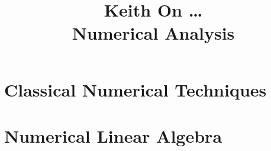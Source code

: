 \documentclass[openany]{book}
\title{
  {\Huge
  Keith On \ldots \\
  \huge
  Numerical Analysis
  \normalsize}
}
\author{
  
}
\date{}
\begin{document}
\normalbaselineskip

\maketitle
\tableofcontents
\listoffigures
\listoftables
\newpage



\part{Classical Numerical Techniques}












\part{Numerical Linear Algebra}





\appendix




\end{document}
